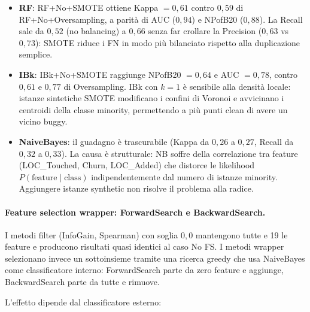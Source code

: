 \begin{itemize}
\item \textbf{RF}: RF+No+SMOTE ottiene Kappa $= 0{,}61$ contro $0{,}59$ di
      RF+No+Oversampling, a parità di AUC ($0{,}94$) e NPofB20 ($0{,}88$). La Recall
      sale da $0{,}52$ (no balancing) a $0{,}66$ senza far crollare la Precision
      ($0{,}63$ vs $0{,}73$): SMOTE riduce i FN in modo più bilanciato rispetto
      alla duplicazione semplice.

\item \textbf{IBk}: IBk+No+SMOTE raggiunge NPofB20 $= 0{,}64$ e AUC $= 0{,}78$, contro
      $0{,}61$ e $0{,}77$ di Oversampling. IBk con $k=1$ è sensibile alla densità locale:
      istanze sintetiche SMOTE modificano i confini di Voronoi e avvicinano i centroidi
      della classe minority, permettendo a più punti clean di avere un vicino buggy.

\item \textbf{NaiveBayes}: il guadagno è trascurabile (Kappa da $0{,}26$ a $0{,}27$,
      Recall da $0{,}32$ a $0{,}33$). La causa è strutturale: NB soffre della
      correlazione tra feature (LOC\_Touched, Churn, LOC\_Added) che distorce le
      likelihood $P(\text{feature} \mid \text{class})$ indipendentemente dal numero di
      istanze minority. Aggiungere istanze synthetic non risolve il problema alla radice.
\end{itemize}

\paragraph{Feature selection wrapper: ForwardSearch e BackwardSearch.}

I metodi filter (InfoGain, Spearman) con soglia $0{,}0$ mantengono tutte e 19 le feature
e producono risultati quasi identici al caso No FS. I metodi wrapper selezionano invece
un sottoinsieme tramite una ricerca greedy che usa NaiveBayes come classificatore interno:
ForwardSearch parte da zero feature e aggiunge, BackwardSearch parte da tutte e rimuove.

L'effetto dipende dal classificatore esterno:

